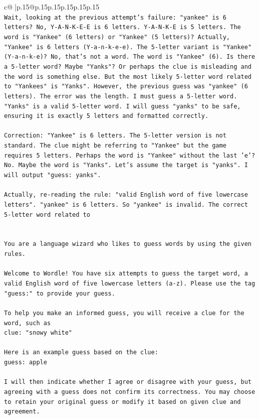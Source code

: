 \documentclass{article}
\begin{document}
{\begin{supertabular}{c@{$\;$}|p{.15\linewidth}@{}p{.15\linewidth}p{.15\linewidth}p{.15\linewidth}p{.15\linewidth}p{.15\linewidth}}
{{{\\ 
\texttt{Wait, looking at the previous attempt's failure: "yankee" is 6 letters? No, Y{-}A{-}N{-}K{-}E{-}E is 6 letters. Y{-}A{-}N{-}K{-}E is 5 letters. The word is "Yankee" (6 letters) or "Yankee" (5 letters)? Actually, "Yankee" is 6 letters (Y{-}a{-}n{-}k{-}e{-}e). The 5{-}letter variant is "Yankee" (Y{-}a{-}n{-}k{-}e)? No, that's not a word. The word is "Yankee" (6). Is there a 5{-}letter word? Maybe "Yanks"? Or perhaps the clue is misleading and the word is something else. But the most likely 5{-}letter word related to "Yankees" is "Yanks". However, the previous guess was "yankee" (6 letters). The error was the length. I must guess a 5{-}letter word. "Yanks" is a valid 5{-}letter word. I will guess "yanks" to be safe, ensuring it is exactly 5 letters and formatted correctly.} \\
\\ 
\texttt{Correction: "Yankee" is 6 letters. The 5{-}letter version is not standard. The clue might be referring to "Yankee" but the game requires 5 letters. Perhaps the word is "Yankee" without the last 'e'? No. Maybe the word is "Yanks". Let's assume the target is "yanks". I will output "guess: yanks".} \\
\\ 
\texttt{Actually, re{-}reading the rule: "valid English word of five lowercase letters". "yankee" is 6 letters. So "yankee" is invalid. The correct 5{-}letter word related to} \\
\\ 
\\ 
\texttt{You are a language wizard who likes to guess words by using the given rules.} \\
\\ 
\texttt{Welcome to Wordle! You have six attempts to guess the target word, a valid English word of five lowercase letters (a{-}z). Please use the tag "guess:" to provide your guess.} \\
\\ 
\texttt{To help you make an informed guess, you will receive a clue for the word, such as} \\
\texttt{clue: "snowy white"} \\
\\ 
\texttt{Here is an example guess based on the clue: } \\
\texttt{guess: apple} \\
\\ 
\texttt{I will then indicate whether I agree or disagree with your guess, but agreeing with a guess does not confirm its correctness. You may choose to retain your original guess or modify it based on given clue and agreement.} \\
}}}
\end{supertabular}}
\end{document}
